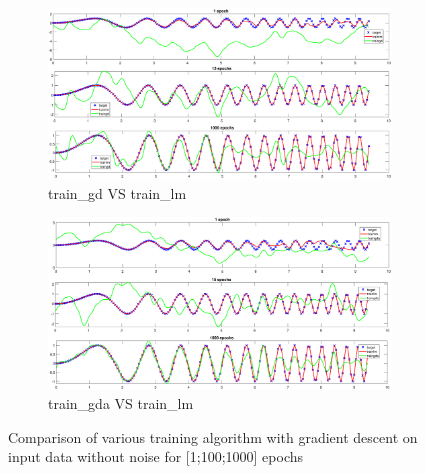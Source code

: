 \begin{figure}[ht]
\begin{subfigure}[b]{0.33\textwidth}
		\includegraphics[height = 0.7\textwidth,width = 1\textwidth]{Exercise1/Report/train_lm_gd}
		\caption{train\_gd VS  train\_lm}\label{fig:train_lm_gd)}
	\end{subfigure}%
	\begin{subfigure}[b]{0.33\textwidth}
		\centering
		\captionsetup{width=0.8\linewidth, format = hang}
		\includegraphics[height = 0.7\textwidth,width = 1\textwidth]{Exercise1/Report/train_lm_gda}
		\caption{train\_gda VS  train\_lm}\label{fig:train_lm_gda)}
	\end{subfigure}%
	\captionsetup{format = hang}
	\caption{Comparison of various training algorithm with gradient descent on input data without noise for [1;100;1000] epochs}
	\label{fig:train_gd}
\end{figure}

